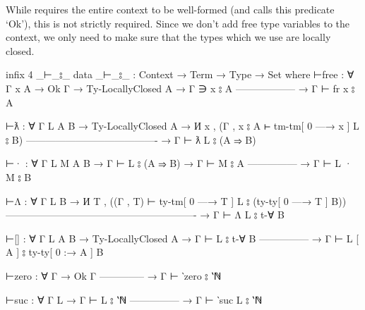 \documentclass[logo,bsc,singlespacing,parskip,online]{infthesis}
\renewenvironment{code}{\mintedcopy[breaklines,breaksymbolleft=\;]{agda}}{\endmintedcopy}
\begin{document}
While \citet{chargueraud_locally_2012} requires the entire context to be well-formed (and calls this
predicate `Ok'), this is not strictly required. Since we don't add free type variables to the
context, we only need to make sure that the types which we use are locally closed.

\begin{code}
  infix  4 _⊢_⦂_
  data _⊢_⦂_ : Context → Term → Type → Set where
    ⊢free : ∀ {Γ x A}
      → Ok Γ
      → Ty-LocallyClosed A
      → Γ ∋ x ⦂ A
        ------------------
      → Γ ⊢ fr x ⦂ A

    ⊢ƛ : ∀ {Γ L A B}
      → Ty-LocallyClosed A
      → И x , (Γ , x ⦂ A ⊢ tm-tm[ 0 —→ x ] L ⦂ B)
        ----------------------------------------
      → Γ ⊢ ƛ L ⦂ (A ⇒ B)

    ⊢· : ∀ {Γ L M A B}
      → Γ ⊢ L ⦂ (A ⇒ B)
      → Γ ⊢ M ⦂ A
        ---------------
      → Γ ⊢ L · M ⦂ B

    ⊢Λ : ∀ {Γ L B}
      → И T , ((Γ , T) ⊢ ty-tm[ 0 —→ T ] L ⦂ (ty-ty[ 0 —→ T ] B))
        ----------------------------------------------------------
      → Γ ⊢ Λ L ⦂ t-∀ B

    ⊢[] : ∀ {Γ L A B}
      → Ty-LocallyClosed A
      → Γ ⊢ L ⦂ t-∀ B
        ---------------
      → Γ ⊢ L [ A ] ⦂ ty-ty[ 0 :→ A ] B

    ⊢zero : ∀ {Γ}
      → Ok Γ
        --------------
      → Γ ⊢ ‵zero ⦂ ‵ℕ

    ⊢suc : ∀ {Γ L}
      → Γ ⊢ L ⦂ ‵ℕ
        ---------------
      → Γ ⊢ ‵suc L ⦂ ‵ℕ
\end{code}
\end{document}

